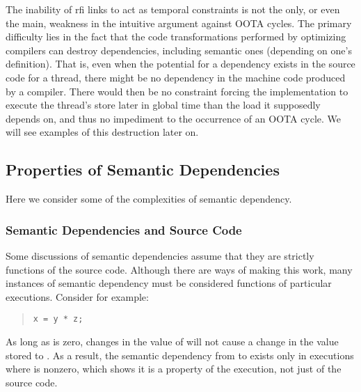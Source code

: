 
The inability of rfi links to act as temporal constraints is not the
only, or even the main, weakness in the intuitive argument against
OOTA cycles.
The primary difficulty lies in the fact that the code transformations
performed by optimizing compilers can destroy dependencies, including
semantic ones (depending on one's definition).
That is, even when the potential for a dependency exists in the
source code for a thread, there might be no dependency in the machine
code produced by a compiler.
There would then be no constraint forcing the implementation to execute
the thread's store later in global time than the load it supposedly depends on,
and thus no impediment to the occurrence of an OOTA cycle.
We will see examples of this destruction later on.

\subsection{Properties of Semantic Dependencies}
\label{sec:Properties of Semantic Dependencies}

Here we consider some of the complexities of semantic dependency.

\subsubsection{Semantic Dependencies and Source Code}
\label{sec:Semantic Dependencies and Source Code}

Some discussions of semantic dependencies assume that they
are strictly functions of the source code.
Although there are ways of making this work, many instances of
semantic dependency must be considered functions of particular executions.
Consider for example:
\begin{quote}
\begin{verbatim}
x = y * z;
\end{verbatim}
\end{quote}

As long as  is zero, changes in the
value of  will not cause a change in the value stored to .
As a result, the semantic dependency from  to  exists only
in executions where  is nonzero,
which shows it is a property of the execution, not just of the source code.

